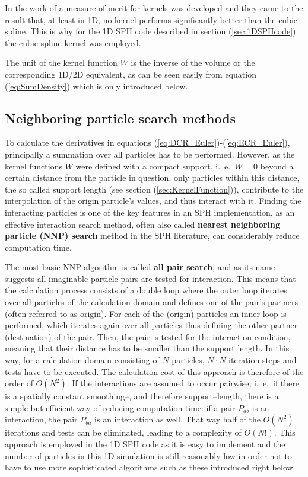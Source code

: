 \documentclass{report}
\begin{document}
In the work of \cite{Fulk1996} a measure of merit for kernels was developed and
they came to the result that, at least in 1D, no kernel performs significantly better than the cubic spline.
This is why for the 1D SPH code described in section (\ref{sec:1DSPHcode}) the cubic spline kernel was employed.

The unit of the kernel function $W$ is the inverse of the volume or the corresponding 1D/2D equivalent, as can be seen easily from equation (\ref{eq:SumDensity}) which is only introduced below.


\subsection{Neighboring particle search methods}
\label{sec:NNPS}
To calculate the derivatives in equations (\ref{eq:DCR_Euler})-(\ref{eq:ECR_Euler}), principally a
summation over all particles has to be performed. However, as the kernel
functions $W$ were defined with a compact support, i.\ e.\ $W=0$ beyond a certain distance from the particle in question, only particles within this distance, the so called support length (see section (\ref{sec:KernelFunction})), contribute to the interpolation of the origin particle's values, and thus interact with it. Finding the interacting particles is one of the key features in an SPH implementation, as an effective interaction search method, often also called {\bf nearest neighboring particle (NNP) search} method in the SPH literature, can considerably reduce computation time. 

The most basic NNP algorithm is called {\bf all pair search}, and as its name
suggests all imaginable particle pairs are tested for interaction. This means
that the calculation process consists of a double loop where the outer loop
iterates over all particles of the calculation domain and defines one of the pair's partners (often
referred to as origin). For each of the (origin) particles an inner loop is
performed, which iterates again over all particles thus defining the other
partner (destination) of the pair. Then, the pair is tested for the
interaction condition, meaning that their distance has to be smaller than the
support length. In this way, for a calculation domain consisting of $N$
particles, $N\cdot N$ iteration steps and tests have to be executed. The
calculation cost of this approach is therefore of the order of $O(N^2)$. 
If the interactions are assumed to occur pairwise, i.\ e.\ if there is a spatially constant
smoothing--, and therefore support--length,
there is a simple but efficient way of reducing computation
time: if a pair $P_{ab}$ is an interaction, the pair
$P_{ba}$ is an interaction as well. That way half of the $O(N^2)$ iterations
and tests can be eliminated, leading to a complexity of $O(N!)$. 
This approach is employed in the 1D SPH code as it is easy to
implement \cite{Liu2003} and the number of particles in this 1D simulation is
still reasonably low in order not to have to use more sophisticated algorithms
such as these introduced right below.
\end{document}
